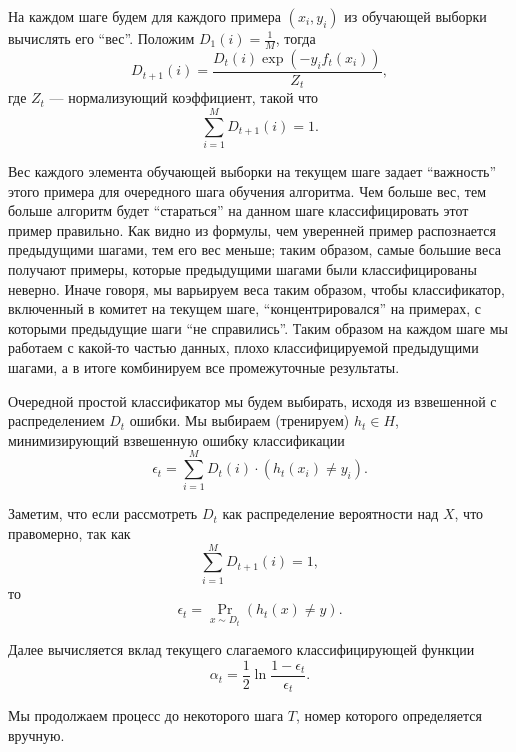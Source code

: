 На каждом шаге будем для каждого примера $(x_i, y_i)$ из обучающей выборки вычислять его ``вес''. Положим $D_1(i) = \frac{1}{M}$, тогда
\begin{displaymath}
  D_{t + 1}(i) = \frac{D_t(i)\exp{(-y_if_t(x_i))}}{Z_t},
\end{displaymath}
где $Z_t$ --- нормализующий коэффициент, такой что
\begin{displaymath}
  \sum_{i = 1}^M{D_{t + 1}(i)} = 1.
\end{displaymath}

Вес каждого элемента обучающей выборки на текущем шаге задает ``важность'' этого примера для очередного шага обучения алгоритма. Чем больше вес, тем больше алгоритм будет ``стараться'' на данном шаге классифицировать этот пример правильно. Как видно из формулы, чем уверенней пример распознается предыдущими шагами, тем его вес меньше; таким образом, самые большие веса получают примеры, которые предыдущими шагами были классифицированы неверно. Иначе говоря, мы варьируем веса таким образом, чтобы классификатор, включенный в комитет на текущем шаге, ``концентрировался'' на примерах,  с которыми предыдущие шаги ``не справились''. Таким образом на каждом шаге мы работаем с какой-то частью данных, плохо классифицируемой предыдущими шагами, а в итоге комбинируем все промежуточные результаты.

Очередной простой классификатор мы будем выбирать, исходя из взвешенной с распределением $D_t$ ошибки. Мы выбираем (тренируем) $h_t \in H$, минимизирующий взвешенную ошибку классификации
\begin{displaymath}
  \epsilon_t = \sum_{i = 1}^M{D_t(i) \cdot (h_t(x_i) \neq y_i)}.
\end{displaymath}

Заметим, что если рассмотреть $D_t$ как распределение вероятности над $X$, что правомерно, так как
\begin{displaymath}
  \sum_{i = 1}^M{D_{t + 1}(i)} = 1,
\end{displaymath}
то
\begin{displaymath}
  \epsilon_t = \underset{x \sim D_t}{\Pr}(h_t(x) \neq y).
\end{displaymath}

Далее вычисляется вклад текущего слагаемого классифицирующей функции
\begin{displaymath}
  \alpha_t = \frac{1}{2}\ln{\frac{1 - \epsilon_t}{\epsilon_t}}.
\end{displaymath}

Мы продолжаем процесс до некоторого шага $T$, номер которого определяется вручную.


